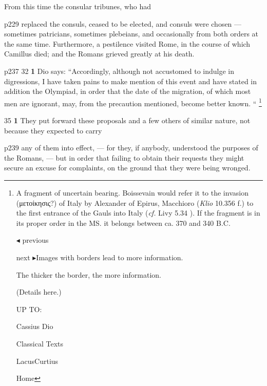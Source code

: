 From this time the consular tribunes, who had

p229 replaced the consuls, ceased to be elected, and consuls were chosen \texthebrew{—} sometimes patricians, sometimes plebeians, and occasionally from both orders at the same time. Furthermore, a pestilence visited Rome, in the course of which Camillus died; and the Romans grieved greatly at his death.

p237
32
\textbf{1} Dio says: ``Accordingly, although not accustomed to indulge in digressions, I have taken pains to make mention of this event and have stated in addition the Olympiad, in order that the date of the migration, of which most men are ignorant, may, from the precaution mentioned, become better known. `` \footnote{A fragment of uncertain bearing. Boissevain would refer it to the invasion (\textgreek{μετοίκησις}?) of Italy by Alexander of Epirus, Macchioro (\emph{Klio} 10.356 f.) to the first entrance of the Gauls into Italy (\emph{cf.} Livy 5.34 ). If the fragment is in its proper order in the MS. it belongs between ca. 370 and 340 B.C.

\texthebrew{◂} previous

next \texthebrew{▸}Images with borders lead to more information.

The thicker the border, the more information.

(Details here.)

UP TO:

Cassius Dio

Classical Texts

LacusCurtius

Home}

35
\textbf{1} They put forward these proposals and a few others of similar nature, not because they expected to carry

p239 any of them into effect, \texthebrew{—} for they, if anybody, understood the purposes of the Romans, \texthebrew{—} but in order that failing to obtain their requests they might secure an excuse for complaints, on the ground that they were being wronged.

